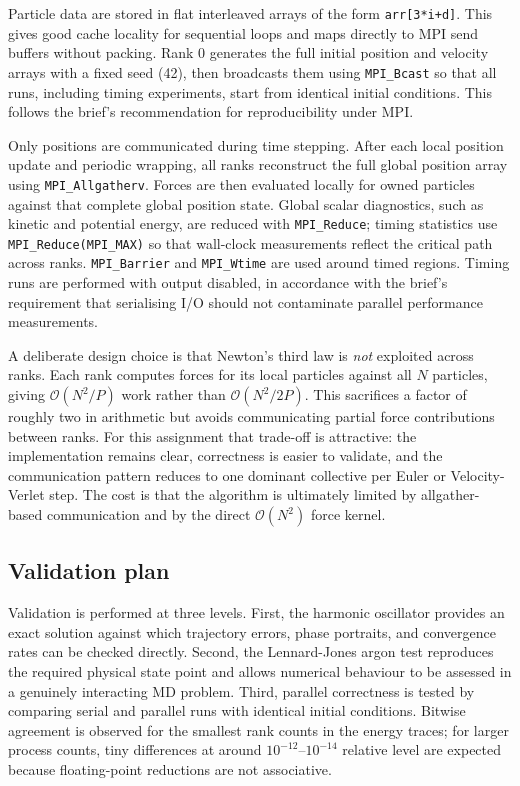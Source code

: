 \documentclass[10pt,twocolumn]{article}
\newcommand{\code}[1]{\texttt{#1}}
\begin{document}
Particle data are stored in flat interleaved arrays of the form \code{arr[3*i+d]}. This gives good cache locality for sequential loops and maps directly to MPI send buffers without packing. Rank 0 generates the full initial position and velocity arrays with a fixed seed (42), then broadcasts them using \code{MPI\_Bcast} so that all runs, including timing experiments, start from identical initial conditions. This follows the brief's recommendation for reproducibility under MPI.

Only positions are communicated during time stepping. After each local position update and periodic wrapping, all ranks reconstruct the full global position array using \code{MPI\_Allgatherv}. Forces are then evaluated locally for owned particles against that complete global position state. Global scalar diagnostics, such as kinetic and potential energy, are reduced with \code{MPI\_Reduce}; timing statistics use \code{MPI\_Reduce(MPI\_MAX)} so that wall-clock measurements reflect the critical path across ranks. \code{MPI\_Barrier} and \code{MPI\_Wtime} are used around timed regions. Timing runs are performed with output disabled, in accordance with the brief's requirement that serialising I/O should not contaminate parallel performance measurements.

A deliberate design choice is that Newton's third law is \emph{not} exploited across ranks. Each rank computes forces for its local particles against all $N$ particles, giving $\mathcal{O}(N^2/P)$ work rather than $\mathcal{O}(N^2/2P)$. This sacrifices a factor of roughly two in arithmetic but avoids communicating partial force contributions between ranks. For this assignment that trade-off is attractive: the implementation remains clear, correctness is easier to validate, and the communication pattern reduces to one dominant collective per Euler or Velocity-Verlet step. The cost is that the algorithm is ultimately limited by allgather-based communication and by the direct $\mathcal{O}(N^2)$ force kernel.

\subsection{Validation plan}

Validation is performed at three levels. First, the harmonic oscillator provides an exact solution against which trajectory errors, phase portraits, and convergence rates can be checked directly. Second, the Lennard-Jones argon test reproduces the required physical state point and allows numerical behaviour to be assessed in a genuinely interacting MD problem. Third, parallel correctness is tested by comparing serial and parallel runs with identical initial conditions. Bitwise agreement is observed for the smallest rank counts in the energy traces; for larger process counts, tiny differences at around $10^{-12}$--$10^{-14}$ relative level are expected because floating-point reductions are not associative.
\end{document}
